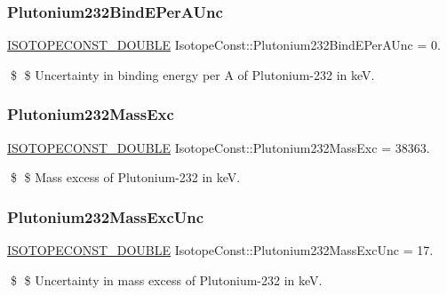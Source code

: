 \subsubsection{\texorpdfstring{Plutonium232\+Bind\+E\+Per\+A\+Unc}{Plutonium232BindEPerAUnc}}
{\footnotesize\ttfamily \mbox{\hyperlink{group___isotope_const-_macros_ga8f45a7272ce02c0b4c65c44636ed719a}{I\+S\+O\+T\+O\+P\+E\+C\+O\+N\+S\+T\+\_\+\+D\+O\+U\+B\+LE}} Isotope\+Const\+::\+Plutonium232\+Bind\+E\+Per\+A\+Unc = 0.}

\$ \$ Uncertainty in binding energy per A of Plutonium-\/232 in keV. \mbox{\label{group___isotope_const-_plutonium-_pu232_ga959913214cbe886c4d808e70231009e5}} 
\subsubsection{\texorpdfstring{Plutonium232\+Mass\+Exc}{Plutonium232MassExc}}
{\footnotesize\ttfamily \mbox{\hyperlink{group___isotope_const-_macros_ga8f45a7272ce02c0b4c65c44636ed719a}{I\+S\+O\+T\+O\+P\+E\+C\+O\+N\+S\+T\+\_\+\+D\+O\+U\+B\+LE}} Isotope\+Const\+::\+Plutonium232\+Mass\+Exc = 38363.}

\$ \$ Mass excess of Plutonium-\/232 in keV. \mbox{\label{group___isotope_const-_plutonium-_pu232_ga0d72b29e494f27e9d1436d39be89213f}} 
\subsubsection{\texorpdfstring{Plutonium232\+Mass\+Exc\+Unc}{Plutonium232MassExcUnc}}
{\footnotesize\ttfamily \mbox{\hyperlink{group___isotope_const-_macros_ga8f45a7272ce02c0b4c65c44636ed719a}{I\+S\+O\+T\+O\+P\+E\+C\+O\+N\+S\+T\+\_\+\+D\+O\+U\+B\+LE}} Isotope\+Const\+::\+Plutonium232\+Mass\+Exc\+Unc = 17.}

\$ \$ Uncertainty in mass excess of Plutonium-\/232 in keV. \mbox{\label{group___isotope_const-_plutonium-_pu232_ga4cb56f42138a0c6e2e0a5e1f18d04c62}} 
